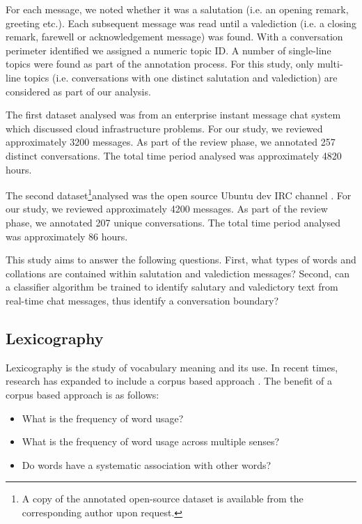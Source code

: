 For each message, we noted whether it was a salutation (i.e. an opening remark, greeting etc.). Each subsequent message was read until a valediction (i.e. a closing remark, farewell or acknowledgement message) was found. With a conversation perimeter identified we assigned a numeric topic ID. A number of single-line topics were found as part of the annotation process. For this study, only multi-line topics (i.e. conversations with one distinct salutation and valediction) are considered as part of our analysis.   

The first dataset analysed was from an enterprise instant message chat system which discussed cloud infrastructure problems. For our study, we reviewed approximately 3200 messages. As part of the review phase, we annotated 257 distinct conversations. The total time period analysed was approximately 4820 hours. 

The second dataset\footnote{A copy of the annotated open-source dataset is available from the corresponding author upon request.}analysed was the open source Ubuntu dev IRC channel \cite{irclogs}. For our study, we reviewed approximately 4200 messages. As part of the review phase, we annotated 207 unique conversations. The total time period analysed was approximately 86 hours. 

This study aims to answer the following questions. First, what types of words and collations are contained within salutation and valediction messages? Second, can a classifier algorithm be trained to identify salutary and valedictory text from real-time chat messages, thus identify a conversation boundary?

\subsection{Lexicography}

Lexicography is the study of vocabulary meaning and its use. In recent times, research has expanded to include a corpus based approach \cite{biber1998corpus}. The benefit of a corpus based approach is as follows:

\begin{itemize}
  \item What is the frequency of word usage?
  \item What is the frequency of word usage across multiple senses?
  \item Do words have a systematic association with other words?
\end{itemize}

